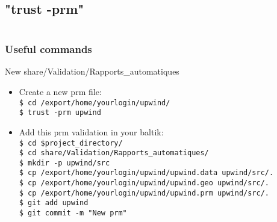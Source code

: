 \documentclass[10pt, hyperref={unicode=true,pdfusetitle, bookmarks=true,bookmarksnumbered=false,bookmarksopen=false, breaklinks=false,pdfborder={0 0 1},backref=true,colorlinks=true,linkcolor=darkblue,pageanchor, urlcolor=darkblue}]{beamer}
\begin{document}
\subsection{{\bf{"trust -prm"}}}
\begin{frame}
\begin{columns}[c] 
\tableofcontents[sections={1-3},currentsection, currentsubsection]
\tableofcontents[sections={4-8},currentsection, currentsubsection]
\end{columns}
\end{frame}
\begin{frame}
\frametitle{Useful commands}
\begin{block}{New share/Validation/Rapports\_automatiques}
\begin{itemize}
\item Create a new prm file:\\
\texttt{\$ cd /export/home/yourlogin/upwind/}\\
\texttt{\$ trust -prm upwind}\\
\item Add this prm validation in your baltik:\\
\texttt{\$ cd \$project\_directory/}\\
\texttt{\$ cd share/Validation/Rapports\_automatiques/}\\
\texttt{\$ mkdir -p upwind/src}\\
\texttt{\$ cp /export/home/yourlogin/upwind/upwind.data upwind/src/.}\\
\texttt{\$ cp /export/home/yourlogin/upwind/upwind.geo upwind/src/.}\\
\texttt{\$ cp /export/home/yourlogin/upwind/upwind.prm upwind/src/.}\\
\texttt{\$ git add upwind}\\
\texttt{\$ git commit -m "New prm"}\\
\end{itemize}
\end{block}
\end{frame}
\end{document}
